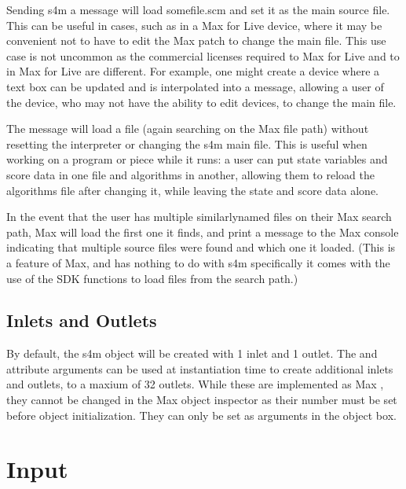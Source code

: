 \documentclass[letterpaper,10pt,english]{sphinxmanual}
\begin{document}
\sphinxAtStartPar
Sending s4m a  message will load some\sphinxhyphen{}file.scm and set it as the main source file.
This can be useful in cases, such as in a Max for Live device, where it may be convenient not to have to edit the Max patch
to change the main file.
This use case is not uncommon as the commercial licenses required to  Max for Live and to  in Max for Live are different.
For example, one might create a device where a text box can be updated and is interpolated into a  message,
allowing a user of the device, who may not have the ability to edit devices, to change the main file.

\sphinxAtStartPar
The message  will load a file (again searching on the Max file path) without resetting the interpreter or
changing the s4m main file.
This is useful when working on a program or piece while it runs: a user can put state variables and score data in one file
and algorithms in another, allowing them to reload the algorithms file after changing it, while leaving the state and score data alone.

\sphinxAtStartPar
In the event that the user has multiple similarly\sphinxhyphen{}named files on their Max search path, Max will load the first one it finds,
and print a message to the Max console indicating that multiple source files were found and which one it loaded.
(This is a feature of Max, and has nothing to do with s4m specifically \sphinxhyphen{} it comes with the use of the SDK functions to
load files from the search path.)


\subsection{Inlets and Outlets}
\label{\detokenize{features_usage:inlets-and-outlets}}
\sphinxAtStartPar
By default, the s4m object will be created with 1 inlet and 1 outlet.
The  and  attribute arguments can be used at instantiation time to create additional inlets and outlets,
to a maxium of 32 outlets.
While these are implemented as Max , they cannot be changed in the Max object inspector as their number must be set
before object initialization. They can only be set as  arguments in the object box.


\section{Input}
\label{\detokenize{features_usage:input}}
\end{document}
